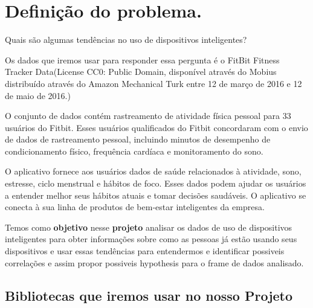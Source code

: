 

\section{Definição do problema.}

Quais são algumas tendências no uso de dispositivos inteligentes?

Os dados que iremos usar para responder essa pergunta é o FitBit Fitness
Tracker Data(License CC0: Public Domain, disponível através do Mobius
distribuído através do Amazon Mechanical Turk entre 12 de março de 2016
e 12 de maio de 2016.)

O conjunto de dados contém rastreamento de atividade física pessoal para
33 usuários do Fitbit. Esses usuários qualificados do Fitbit concordaram
com o envio de dados de rastreamento pessoal, incluindo minutos de
desempenho de condicionamento físico, frequência cardíaca e
monitoramento do sono.

O aplicativo fornece aos usuários dados de saúde relacionados à
atividade, sono, estresse, ciclo menstrual e hábitos de foco. Esses
dados podem ajudar os usuários a entender melhor seus hábitos atuais e
tomar decisões saudáveis. O aplicativo se conecta à sua linha de
produtos de bem-estar inteligentes da empresa.

Temos como \textbf{objetivo} nesse \textbf{projeto} analisar os dados de
uso de dispositivos inteligentes para obter informações sobre como as
pessoas já estão usando seus dispositivos e usar essas tendências para
entendermos e identificar possiveis correlações e assim propor possiveis
hypothesis para o frame de dados analisado.


\subsection{Bibliotecas que iremos usar no nosso Projeto}

